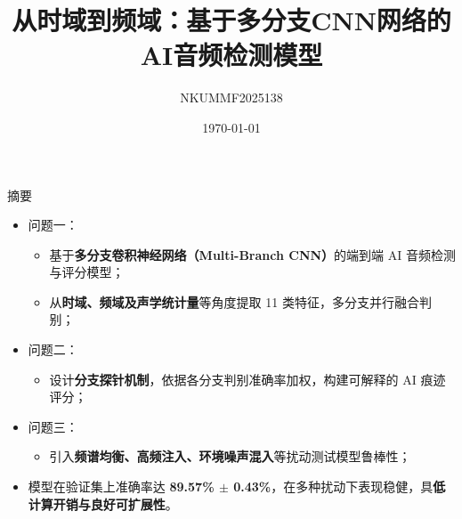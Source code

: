 \documentclass[aspectratio=169]{beamer}
\title{从时域到频域：基于多分支CNN网络的AI音频检测模型}
\author{NKUMMF2025138}
\date{\today}
\begin{document}
\begin{frame}{摘要}
\small
\begin{itemize}
  \item 问题一：
    \begin{itemize}
      \item 基于\textbf{多分支卷积神经网络（Multi-Branch CNN）}的端到端 AI 音频检测与评分模型；
      \item 从\textbf{时域、频域及声学统计量}等角度提取 11 类特征，多分支并行融合判别；
    \end{itemize}

  \item 问题二：
    \begin{itemize}
      \item 设计\textbf{分支探针机制}，依据各分支判别准确率加权，构建可解释的 AI 痕迹评分；
    \end{itemize}

  \item 问题三：
    \begin{itemize}
      \item 引入\textbf{频谱均衡、高频注入、环境噪声混入}等扰动测试模型鲁棒性；
    \end{itemize}
  \vspace{0.8cm}
  \item 模型在验证集上准确率达 \textbf{89.57\% $\pm$ 0.43\%}，在多种扰动下表现稳健，具\textbf{低计算开销与良好可扩展性}。
\end{itemize}
\end{frame}
\end{document}
